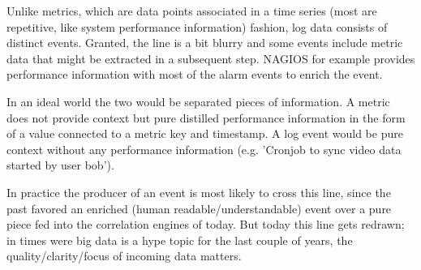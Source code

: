 Unlike metrics, which are data points associated in a time series (most are repetitive, like system performance information)
fashion, log data consists of distinct events. Granted, the line is a bit blurry and some events include metric data that
might be extracted in a subsequent step. NAGIOS for example provides performance information with most of the alarm events to enrich the event.

In an ideal world the two would be separated pieces of information. A metric does not provide context
but pure distilled performance information in the form of a value connected to a metric key and timestamp.
A log event would be pure context without any performance information (e.g. 'Cronjob to sync video data started by user bob'). 

In practice the producer of an event is most likely to cross this line, since the past favored an enriched (human readable/understandable) event over a
pure piece fed into the correlation engines of today. But today this line gets redrawn; in times were big data is a hype topic for the last couple
of years, the quality/clarity/focus of incoming data matters.
